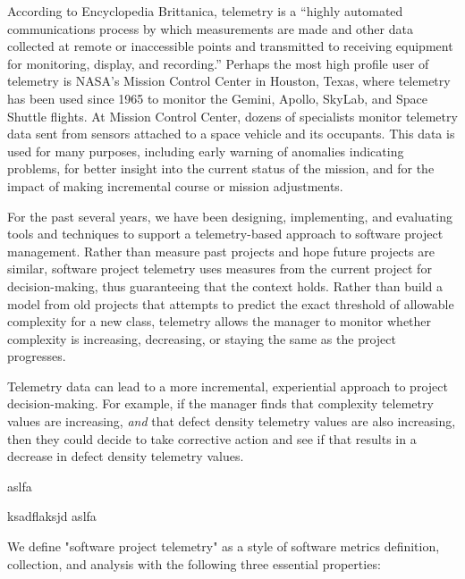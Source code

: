 \documentclass[11pt,twocolumn]{article}
\begin{document}

According to Encyclopedia Brittanica, telemetry is a ``highly automated
communications process by which measurements are made and other data
collected at remote or inaccessible points and transmitted to receiving
equipment for monitoring, display, and recording.''  Perhaps the most high
profile user of telemetry is NASA's Mission Control Center in Houston,
Texas, where telemetry has been used since 1965 to monitor the Gemini,
Apollo, SkyLab, and Space Shuttle flights.  At Mission Control Center,
dozens of specialists monitor telemetry data sent from sensors attached to
a space vehicle and its occupants.  This data is used for many purposes,
including early warning of anomalies indicating problems, for better
insight into the current status of the mission, and for the impact of
making incremental course or mission adjustments.

For the past several years, we have been designing, implementing, and
evaluating tools and techniques to support a telemetry-based approach to
software project management. Rather than measure past projects and hope
future projects are similar, software project telemetry uses measures from
the current project for decision-making, thus guaranteeing that the context
holds.  Rather than build a model from old projects that attempts to
predict the exact threshold of allowable complexity for a new class,
telemetry allows the manager to monitor whether complexity is increasing,
decreasing, or staying the same as the project progresses.  

Telemetry data can lead to a more incremental, experiential approach to
project decision-making. For example, if the manager finds that complexity
telemetry values are increasing, {\em and} that defect density telemetry
values are also increasing, then they could decide to take corrective
action and see if that results in a decrease in defect density telemetry
values.     

   aslfa

ksadflaksjd aslfa

We define "software project telemetry" as a style of software metrics
definition, collection, and analysis with the following three essential
properties:
\end{document}

